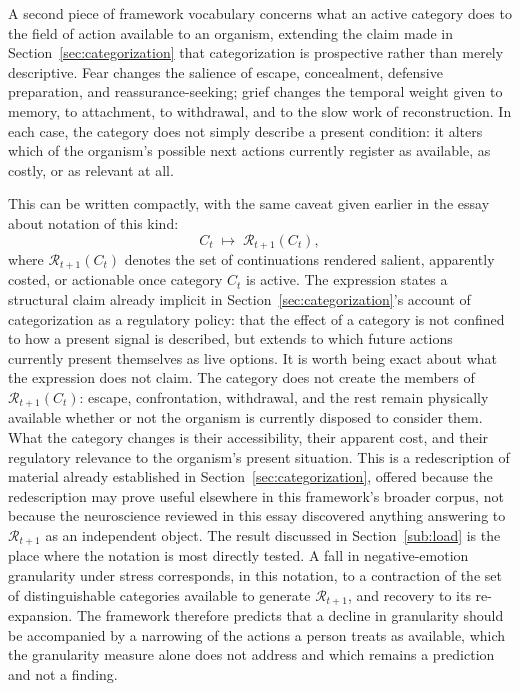 \documentclass[11pt]{article}
\begin{document}
A second piece of framework vocabulary concerns what an active category does to the field of action available to an organism, extending the claim made in Section~\ref{sec:categorization} that categorization is prospective rather than merely descriptive. Fear changes the salience of escape, concealment, defensive preparation, and reassurance-seeking; grief changes the temporal weight given to memory, to attachment, to withdrawal, and to the slow work of reconstruction. In each case, the category does not simply describe a present condition: it alters which of the organism's possible next actions currently register as available, as costly, or as relevant at all.

This can be written compactly, with the same caveat given earlier in the essay about notation of this kind:
\[
C_t \;\mapsto\; \mathcal{R}_{t+1}(C_t),
\]
where $\mathcal{R}_{t+1}(C_t)$ denotes the set of continuations rendered salient, apparently costed, or actionable once category $C_t$ is active. The expression states a structural claim already implicit in Section~\ref{sec:categorization}'s account of categorization as a regulatory policy: that the effect of a category is not confined to how a present signal is described, but extends to which future actions currently present themselves as live options. It is worth being exact about what the expression does not claim. The category does not create the members of $\mathcal{R}_{t+1}(C_t)$: escape, confrontation, withdrawal, and the rest remain physically available whether or not the organism is currently disposed to consider them. What the category changes is their accessibility, their apparent cost, and their regulatory relevance to the organism's present situation. This is a redescription of material already established in Section~\ref{sec:categorization}, offered because the redescription may prove useful elsewhere in this framework's broader corpus, not because the neuroscience reviewed in this essay discovered anything answering to $\mathcal{R}_{t+1}$ as an independent object. The result discussed in Section~\ref{sub:load} is the place where the notation is most directly tested. A fall in negative-emotion granularity under stress corresponds, in this notation, to a contraction of the set of distinguishable categories available to generate $\mathcal{R}_{t+1}$, and recovery to its re-expansion. The framework therefore predicts that a decline in granularity should be accompanied by a narrowing of the actions a person treats as available, which the granularity measure alone does not address and which remains a prediction and not a finding.
\end{document}
